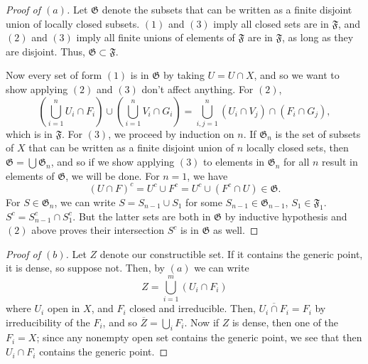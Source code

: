 \documentclass[12pt,letterpaper]{article}
\theoremstyle{definition}
\theoremstyle{remark}
\numberwithin{equation}{section}
\numberwithin{figure}{problem}
\begin{document}
\begin{proof}[Proof of $(a)$]
  Let $\mathfrak{G}$ denote the subsets that can be written as a finite disjoint union of locally closed subsets. $(1)$ and $(3)$ imply all closed sets are in $\mathfrak{F}$, and $(2)$ and $(3)$ imply all finite unions of elements of $\mathfrak{F}$ are in $\mathfrak{F}$, as long as they are disjoint. Thus, $\mathfrak{G} \subset \mathfrak{F}$.
  \par Now every set of form $(1)$ is in $\mathfrak{G}$ by taking $U = U \cap X$, and so we want to show applying $(2)$ and $(3)$ don't affect anything. For $(2)$,
  \begin{equation*}
    \left( \bigcup_{i=1}^n U_i \cap F_i \right) \cup \left( \bigcup_{i=1}^n V_i \cap G_i \right) = \bigcup_{i,j=1}^n (U_i \cap V_j) \cap (F_i \cap G_j),
  \end{equation*}
  which is in $\mathfrak{F}$. For $(3)$, we proceed by induction on $n$. If $\mathfrak{G}_n$ is the set of subsets of $X$ that can be written as a finite disjoint union of $n$ locally closed sets, then $\mathfrak{G} = \bigcup \mathfrak{G}_n$, and so if we show applying $(3)$ to elements in $\mathfrak{G}_n$ for all $n$ result in elements of $\mathfrak{G}$, we will be done. For $n=1$, we have
  \begin{equation*}
    (U \cap F)^c = U^c \cup F^c = U^c \cup (F^c \cap U) \in \mathfrak{G}.
  \end{equation*}
  For $S \in \mathfrak{G}_n$, we can write $S = S_{n-1} \cup S_1$ for some $S_{n-1} \in \mathfrak{G}_{n-1}$, $S_1 \in \mathfrak{F}_1$. $S^c = S^c_{n-1} \cap S_1^c$. But the latter sets are both in $\mathfrak{G}$ by inductive hypothesis and $(2)$ above proves their intersection $S^c$ is in $\mathfrak{G}$ as well.
\end{proof}
\begin{proof}[Proof of $(b)$]
  Let $Z$ denote our constructible set. If it contains the generic point, it is dense, so suppose not. Then, by $(a)$ we can write
  \begin{equation*}
    Z = \bigcup_{i=1}^m (U_i \cap F_i)
  \end{equation*}
  where $U_i$ open in $X$, and $F_i$ closed and irreducible. Then, $\overline{U_i \cap F_i} = F_i$ by irreducibility of the $F_i$, and so $\overline{Z} = \bigcup_i F_i$. Now if $Z$ is dense, then one of the $F_i = X$; since any nonempty open set contains the generic point, we see that then $U_i \cap F_i$ contains the generic point. 
\end{proof}
\end{document}
